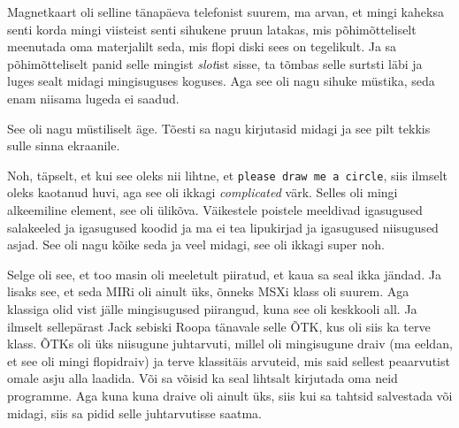 
Magnetkaart oli selline  tänapäeva  telefonist suurem, ma arvan, et mingi kaheksa senti korda mingi viisteist senti sihukene pruun latakas, mis põhimõtteliselt meenutada oma materjalilt seda, mis flopi diski sees on tegelikult. Ja sa põhimõtteliselt panid selle mingist \emph{slot}ist sisse, ta tõmbas selle surtsti läbi ja luges sealt midagi mingisuguses koguses. Aga see oli nagu sihuke müstika, seda enam niisama lugeda ei saadud. 


See oli nagu müstiliselt äge. Tõesti sa nagu kirjutasid midagi ja see pilt tekkis sulle  sinna ekraanile.


Noh, täpselt, et kui see oleks nii lihtne, et \verb|please draw me a circle|, siis  ilmselt oleks kaotanud huvi, aga see oli ikkagi \emph{complicated} värk. Selles oli mingi alkeemiline element, see oli ülikõva. Väikestele poistele meeldivad igasugused salakeeled ja igasugused koodid ja ma ei tea lipukirjad ja igasugused niisugused asjad. See  oli nagu kõike seda  ja veel midagi,  see oli ikkagi super noh.

Selge oli see, et too masin oli  meeletult piiratud, et kaua sa seal ikka jändad. Ja lisaks see, et seda MIRi oli ainult üks, õnneks MSXi klass oli suurem. Aga klassiga olid vist jälle mingisugused piirangud, kuna see oli keskkooli all. Ja ilmselt sellepärast Jack sebiski Roopa tänavale selle ÕTK, kus oli siis ka terve klass. ÕTKs oli  üks niisugune juhtarvuti, millel oli mingisugune draiv (ma eeldan, et see oli mingi flopidraiv) ja terve klassitäis arvuteid, mis said sellest peaarvutist omale asju alla laadida. Või sa võisid ka seal lihtsalt kirjutada oma neid programme. Aga kuna kuna draive oli ainult üks, siis kui sa tahtsid salvestada või midagi,  siis sa pidid selle juhtarvutisse saatma. 

